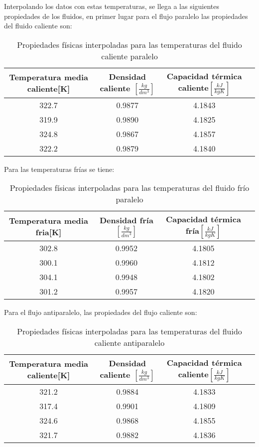 \documentclass[letterpaper,11pt]{article} %
\begin{document}
Interpolando los datos con estas temperaturas, se llega a las siguientes propiedades de los fluidos, en primer lugar para el flujo paralelo las propiedades del fluido caliente son:
\begin{table}[htbp]
    \centering
    \caption{Propiedades físicas interpoladas para las temperaturas del fluido caliente paralelo}
    \begin{tabular}{c|c|c|c|}
    
        Temperatura media caliente[K]&Densidad caliente $[\frac{kg}{dm^3}]$ & Capacidad térmica caliente$[\frac{kJ}{kgK}]$\\
        \hline
        322.7 & 0.9877 & 4.1843\\
        319.9 & 0.9890 & 4.1825\\
        324.8 & 0.9867 & 4.1857\\
        322.2 & 0.9879 & 4.1840 \\
    \end{tabular}
    \label{tab:propcalienteparalelo}
\end{table}
\newpage
Para las temperaturas frías se tiene:
\begin{table}[htbp]
    \centering
    \caption{Propiedades físicas interpoladas para las temperaturas del fluido frío paralelo}
    \begin{tabular}{c|c|c|c|}
    
        Temperatura media fria[K]&Densidad fría $[\frac{kg}{dm^3}]$ & Capacidad térmica fría$[\frac{kJ}{kgK}]$\\
        \hline
        302.8 & 0.9952 & 4.1805\\
        300.1 & 0.9960 & 4.1812\\
        304.1 & 0.9948 & 4.1802\\
        301.2 & 0.9957 & 4.1820 \\
    \end{tabular}
    \label{tab:propfriaparalelo}
\end{table}
\newp
Para el flujo antiparalelo, las propiedades del flujo caliente son:
\begin{table}[htbp]
    \centering
    \caption{Propiedades físicas interpoladas para las temperaturas del fluido caliente antiparalelo}
    \begin{tabular}{c|c|c|c|}
    
        Temperatura media caliente[K]&Densidad caliente $[\frac{kg}{dm^3}]$ & Capacidad térmica caliente$[\frac{kJ}{kgK}]$\\
        \hline
        321.2 & 0.9884 & 4.1833\\
        317.4 & 0.9901 & 4.1809\\
        324.6 & 0.9868 & 4.1855\\
        321.7 & 0.9882 & 4.1836 \\
    \end{tabular}
    \label{tab:propcalienteantiparalelo}
\end{table}
\end{document}
